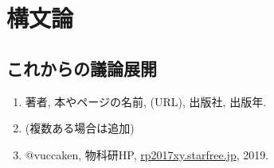 \documentclass[10pt,b5paper,papersize,dvipdfmx]{jsbook}
\begin{document}
\section{構文論}
\subsection{これからの議論展開}


\begin{sanko}
  \begin{enumerate}
    \item 著者, 本やページの名前, (URL), 出版社, 出版年.
    \item (複数ある場合は追加)
    \item @vuccaken, 物科研HP, \url{rp2017xy.starfree.jp}, 2019.
  \end{enumerate}
\end{sanko}
\end{document}

